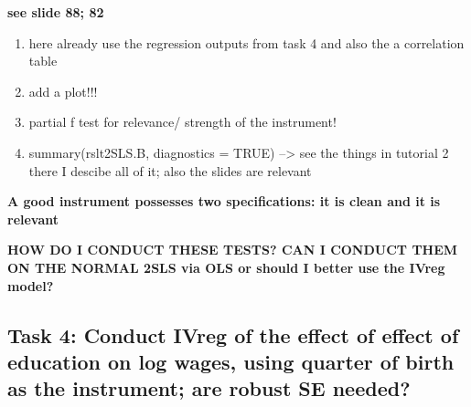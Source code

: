 \documentclass[a4paper]{article}
\begin{document}
\textbf{see slide 88; 82}

\begin{enumerate}
   \item here already use the regression outputs from task 4 and also the a correlation table 
   \item add a plot!!!
   \item partial f test for relevance/ strength of the instrument!
   \item summary(rslt2SLS.B, diagnostics = TRUE) --> see the things in tutorial 2 there I descibe all of it; also the slides are relevant
\end{enumerate}

\textbf{A good instrument possesses two specifications: it is clean and it is relevant}



\textbf{HOW DO I CONDUCT THESE TESTS? CAN I CONDUCT THEM ON THE NORMAL 2SLS via OLS or should I better use the IVreg model?}



\subsection{Task 4: Conduct IVreg of the effect of effect of education on log wages, using quarter of birth as the instrument; are robust SE needed?}
\end{document}
